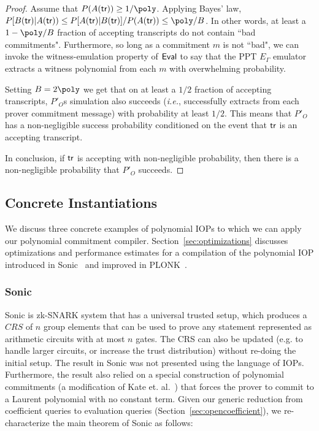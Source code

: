 \begin{proof}
Assume that $P(A(\tr)) \geq 1/\poly$. Applying Bayes' law, %
$P[B(\tr) | A(\tr)) \leq P[A(\tr) | B(\tr)] / P(A(\tr)) \leq \poly / B$. 
In other words, at least a $1 - \poly/B$ fraction of accepting transcripts do not contain ``bad commitments". %
Furthermore, so long as a commitment $m$ is not ``bad", we can invoke the witness-emulation property of $\textsf{{Eval}}$ to say that the PPT $E_\Gamma$ emulator extracts a witness polynomial from each $m$ with overwhelming probability.

Setting $B = 2 \poly$ we get that on at least a $1/2$ fraction of accepting transcripts, $P'_O$s simulation also succeeds (\emph{i.e.}, successfully extracts from each prover commitment message) with probability at least $1/2$. This means that $P'_O$ has a non-negligible success probability conditioned on the event that $\textsf{{tr}}$ is an accepting transcript. 

In conclusion, if $\textsf{{tr}}$ is accepting with non-negligible probability, then there is a non-negligible probability that $P'_O$ succeeds. 


\end{proof}

\subsection{Concrete Instantiations} 
We discuss three concrete examples of polynomial IOPs to which we can apply our polynomial commitment compiler. Section~\ref{sec:optimizations} discusses optimizations and performance estimates for a compilation of the polynomial IOP introduced in \textsf{Sonic}~\cite{Sonic} and improved in \textsf{PLONK}~\cite{Plonk}. 

\subsubsection{Sonic} 
\textsf{Sonic} is zk-SNARK system that has a universal trusted setup, which produces a $CRS$ of $n$ group elements that can be used to prove any statement represented as arithmetic circuits with at most $n$ gates. The CRS can also be updated (e.g. to handle larger circuits, or increase the trust distribution) without re-doing the initial setup. The result in \textsf{Sonic} was not presented using the language of IOPs. Furthermore, the result also relied on a special construction of polynomial commitments (a modification of Kate et. al.~\cite{AC:KatZavGol10}) that forces the prover to commit to a Laurent polynomial with no constant term. Given our generic reduction from coefficient queries to evaluation queries (Section~\ref{sec:opencoefficient}), we re-characterize the main theorem of \textsf{Sonic} as follows: 

